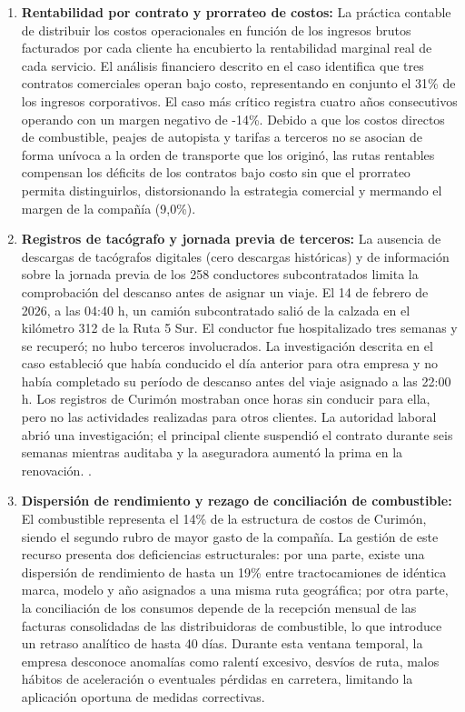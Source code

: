 \begin{enumerate}
  \item \textbf{Rentabilidad por contrato y prorrateo de costos:} La práctica contable de distribuir los costos operacionales en función de los ingresos brutos facturados por cada cliente ha encubierto la rentabilidad marginal real de cada servicio. El análisis financiero descrito en el caso identifica que tres contratos comerciales operan bajo costo, representando en conjunto el 31\% de los ingresos corporativos. El caso más crítico registra cuatro años consecutivos operando con un margen negativo de -14\%. Debido a que los costos directos de combustible, peajes de autopista y tarifas a terceros no se asocian de forma unívoca a la orden de transporte que los originó, las rutas rentables compensan los déficits de los contratos bajo costo sin que el prorrateo permita distinguirlos, distorsionando la estrategia comercial y mermando el margen de la compañía (9,0\%).
  \item \textbf{Registros de tacógrafo y jornada previa de terceros:} La ausencia de descargas de tacógrafos digitales (cero descargas históricas) y de información sobre la jornada previa de los 258 conductores subcontratados limita la comprobación del descanso antes de asignar un viaje. El 14 de febrero de 2026, a las 04:40 h, un camión subcontratado salió de la calzada en el kilómetro 312 de la Ruta 5 Sur. El conductor fue hospitalizado tres semanas y se recuperó; no hubo terceros involucrados. La investigación descrita en el caso estableció que había conducido el día anterior para otra empresa y no había completado su período de descanso antes del viaje asignado a las 22:00 h. Los registros de Curimón mostraban once horas sin conducir para ella, pero no las actividades realizadas para otros clientes. La autoridad laboral abrió una investigación; el principal cliente suspendió el contrato durante seis semanas mientras auditaba y la aseguradora aumentó la prima en la renovación. .
  \item \textbf{Dispersión de rendimiento y rezago de conciliación de combustible:} El combustible representa el 14\% de la estructura de costos de Curimón, siendo el segundo rubro de mayor gasto de la compañía. La gestión de este recurso presenta dos deficiencias estructurales: por una parte, existe una dispersión de rendimiento de hasta un 19\% entre tractocamiones de idéntica marca, modelo y año asignados a una misma ruta geográfica; por otra parte, la conciliación de los consumos depende de la recepción mensual de las facturas consolidadas de las distribuidoras de combustible, lo que introduce un retraso analítico de hasta 40 días. Durante esta ventana temporal, la empresa desconoce anomalías como ralentí excesivo, desvíos de ruta, malos hábitos de aceleración o eventuales pérdidas en carretera, limitando la aplicación oportuna de medidas correctivas.

\end{enumerate}

